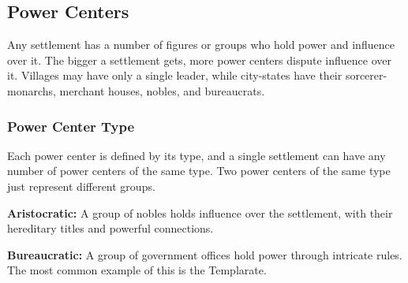 \subsection{Power Centers}
Any settlement has a number of figures or groups who hold power and influence over it. The bigger a settlement gets, more power centers dispute influence over it. Villages may have only a single leader, while city-states have their sorcerer-monarchs, merchant houses, nobles, and bureaucrats.


\subsubsection{Power Center Type}
Each power center is defined by its type, and a single settlement can have any number of power centers of the same type. Two power centers of the same type just represent different groups.


\textbf{Aristocratic:} A group of nobles holds influence over the settlement, with their hereditary titles and powerful connections.

\textbf{Bureaucratic:} A group of government offices hold power through intricate rules. The most common example of this is the Templarate.

